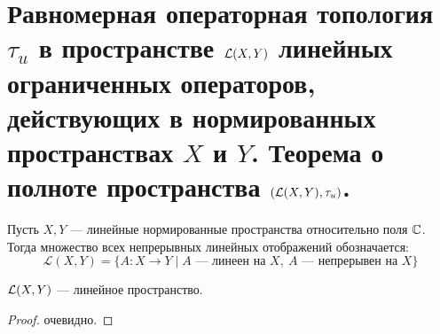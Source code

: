 \newpage
\section{Равномерная операторная топология $\tau_u$ в пространстве $\mathcal{L}(X, Y)$ линейных ограниченных операторов, действующих в нормированных пространствах $X$ и $Y$. Теорема о полноте пространства $(\mathcal{L}(X,Y), \tau_u)$.}

\begin{definition}
	Пусть $X,Y$ --- линейные нормированные пространства относительно поля $\mathbb{C}$. Тогда множество всех непрерывных линейных отображений обозначается:
	$$
	\mathcal{{L}}(X, Y) = \{A: X \to Y \mid A \text{ --- линеен на $X$}, \ A \text{ --- непрерывен на $X$}\}
	$$
\end{definition}

\begin{claim}
	$\mathcal{L}(X,Y)$ --- линейное пространство.
\end{claim}
\begin{proof}
	очевидно. 
\end{proof}

